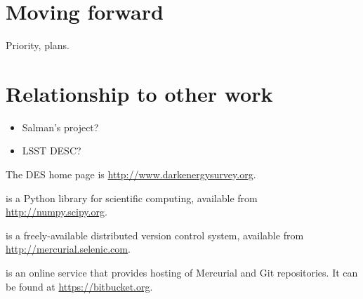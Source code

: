 \documentclass[draftmode,draftwater]{memarticle}
\begin{document}

\chapter{Moving forward}

Priority, plans.

\chapter{Relationship to other work}

\begin{itemize}
\item Salman's project?
\item LSST DESC?
\end{itemize}

\appendix

\begin{thebibliography}{99}

 The DES home page is
  \url{http://www.darkenergysurvey.org}.

  is a Python library for scientific
  computing, available from \url{http://numpy.scipy.org}.

  is a freely-available distributed
  version control system, available from
  \url{http://mercurial.selenic.com}.

  is an online service that provides
  hosting of Mercurial and Git repositories. It can be found at
  \url{https://bitbucket.org}.

\end{thebibliography}
\end{document}
